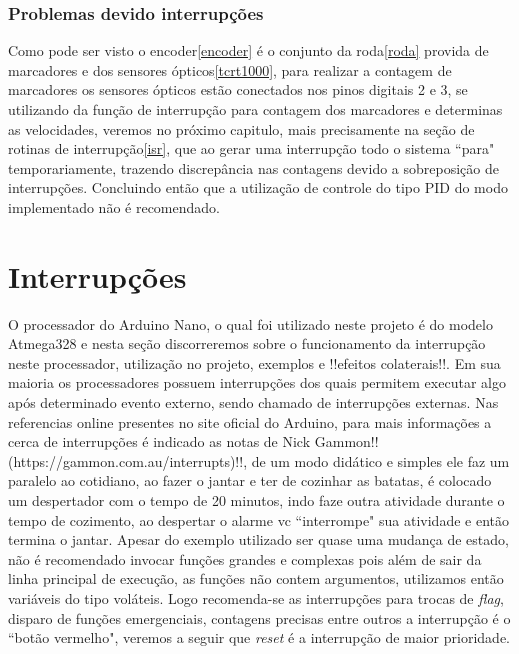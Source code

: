 \documentclass[a4paper,12pt,portuguese]{ufms-cpcx}
\begin{document}
\subsection{Problemas devido interrupções}
Como pode ser visto o encoder\ref{encoder} é o conjunto da roda\ref{roda} provida de marcadores e  dos sensores ópticos\ref{tcrt1000}, para realizar a contagem de marcadores os sensores ópticos estão conectados nos pinos digitais 2 e 3, se utilizando da função de interrupção para contagem dos marcadores e determinas as velocidades, veremos no próximo capitulo, mais precisamente na seção de rotinas de interrupção\ref{isr}, que ao gerar uma interrupção todo o sistema ``para" temporariamente, trazendo discrepância nas contagens devido a sobreposição de interrupções.
Concluindo então que a utilização de controle do tipo PID do modo implementado não é recomendado.
  

\chapter{Interrupções}
O processador do Arduino Nano, o qual foi utilizado neste projeto é do modelo Atmega328 e nesta seção discorreremos sobre o funcionamento da interrupção neste processador, utilização no projeto, exemplos e !!efeitos colaterais!!.
Em sua maioria os processadores possuem interrupções dos quais permitem executar algo após determinado evento externo, sendo chamado de interrupções externas. Nas referencias online presentes no site oficial do Arduino, para mais informações a cerca de interrupções é indicado as notas de Nick Gammon!!(https://gammon.com.au/interrupts)!!, de um modo didático e simples ele faz um paralelo ao cotidiano, ao fazer o jantar e ter de cozinhar as batatas, é colocado um despertador com o tempo de 20 minutos, indo faze outra atividade durante o tempo de cozimento, ao despertar o alarme vc ``interrompe" sua atividade e então termina o jantar. Apesar do exemplo utilizado ser quase uma mudança de estado, não é recomendado invocar funções grandes e complexas pois além de sair da linha principal de execução, as funções não contem argumentos, utilizamos então variáveis do tipo voláteis. Logo recomenda-se as interrupções para trocas de \textit{flag}, disparo de funções emergenciais, contagens precisas entre outros a interrupção é o ``botão vermelho", veremos a seguir que \textit{reset} é a interrupção de maior prioridade.
\end{document}

